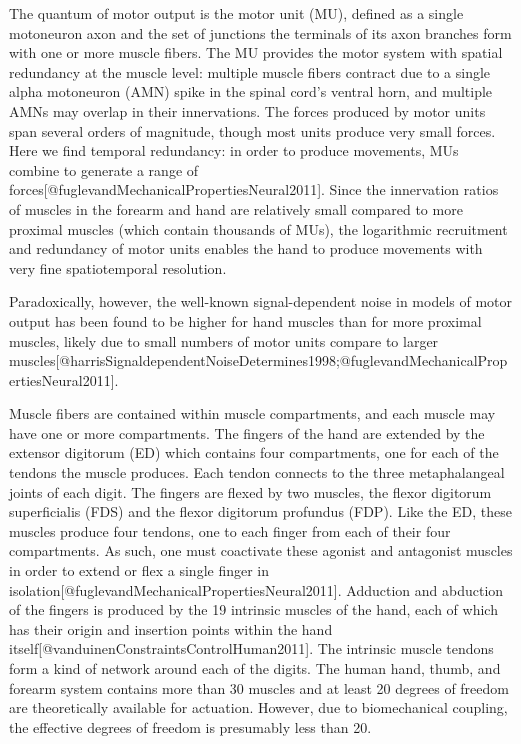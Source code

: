 \documentclass[../main.tex]{subfiles}
\begin{document}
The quantum of motor output is the motor unit (MU), defined as a single motoneuron axon and the set of junctions the terminals of its axon branches form with one or more muscle fibers. The MU provides the motor system with spatial redundancy at the muscle level: multiple muscle fibers contract due to a single alpha motoneuron (AMN) spike in the spinal cord's ventral horn, and multiple AMNs may overlap in their innervations. The forces produced by motor units span several orders of magnitude, though most units produce very small forces. Here we find temporal redundancy: in order to produce movements, MUs combine to generate a range of forces[@fuglevandMechanicalPropertiesNeural2011]. Since the innervation ratios of muscles in the forearm and hand are relatively small compared to more proximal muscles (which contain thousands of MUs), the logarithmic recruitment and redundancy of motor units enables the hand to produce movements with very fine spatiotemporal resolution.

 Paradoxically, however, the well-known signal-dependent noise in models of motor output has been found to be higher for hand muscles than for more proximal muscles, likely due to small numbers of motor units compare to larger muscles[@harrisSignaldependentNoiseDetermines1998;@fuglevandMechanicalPropertiesNeural2011]. 

Muscle fibers are contained within muscle compartments, and each muscle may have one or more compartments. The fingers of the hand are extended by the extensor digitorum (ED) which contains four compartments, one for each of the tendons the muscle produces. Each tendon connects to the three metaphalangeal joints of each digit. The fingers are flexed by two muscles, the flexor digitorum superficialis (FDS) and the flexor digitorum profundus (FDP). Like the ED, these muscles produce four tendons, one to each finger from each of their four compartments. As such, one must coactivate these agonist and antagonist muscles in order to extend or flex a single finger in isolation[@fuglevandMechanicalPropertiesNeural2011]. Adduction and abduction of the fingers is produced by the 19 intrinsic muscles of the hand, each of which has their origin and insertion points within the hand itself[@vanduinenConstraintsControlHuman2011]. The intrinsic muscle tendons form a kind of network around each of the digits. The human hand, thumb, and forearm system contains more than 30 muscles and at least 20 degrees of freedom are theoretically available for actuation. However, due to biomechanical coupling, the effective degrees of freedom is presumably less than 20.
\end{document}
